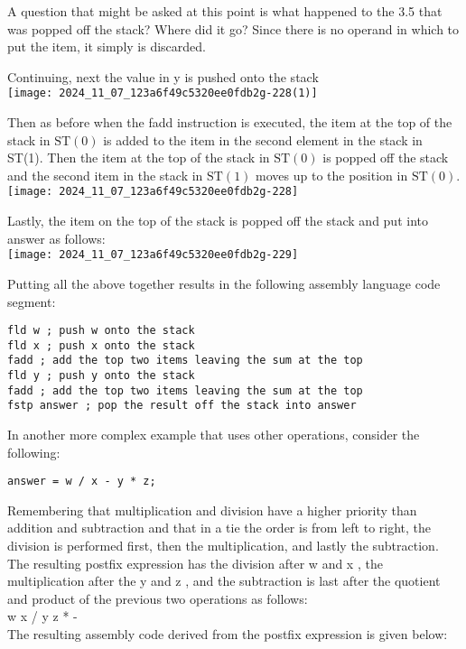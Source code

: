 \documentclass[10pt]{article}
\begin{document}
A question that might be asked at this point is what happened to the 3.5 that was popped off the stack? Where did it go? Since there is no operand in which to put the item, it simply is discarded.

Continuing, next the value in y is pushed onto the stack\\
\texttt{[image: 2024\_11\_07\_123a6f49c5320ee0fdb2g-228(1)]}

Then as before when the fadd instruction is executed, the item at the top of the stack in $\mathrm{ST}(0)$ is added to the item in the second element in the stack in ST(1). Then the item at the top of the stack in $\mathrm{ST}(0)$ is popped off the stack and the second item in the stack in $\mathrm{ST}(1)$ moves up to the position in $\mathrm{ST}(0)$.\\
\texttt{[image: 2024\_11\_07\_123a6f49c5320ee0fdb2g-228]}

Lastly, the item on the top of the stack is popped off the stack and put into answer as follows:\\
\texttt{[image: 2024\_11\_07\_123a6f49c5320ee0fdb2g-229]}

Putting all the above together results in the following assembly language code segment:

\begin{verbatim}
fld w ; push w onto the stack
fld x ; push x onto the stack
fadd ; add the top two items leaving the sum at the top
fld y ; push y onto the stack
fadd ; add the top two items leaving the sum at the top
fstp answer ; pop the result off the stack into answer
\end{verbatim}

In another more complex example that uses other operations, consider the following:

\begin{verbatim}
answer = w / x - y * z;
\end{verbatim}

Remembering that multiplication and division have a higher priority than addition and subtraction and that in a tie the order is from left to right, the division is performed first, then the multiplication, and lastly the subtraction. The resulting postfix expression has the division after w and x , the multiplication after the y and z , and the subtraction is last after the quotient and product of the previous two operations as follows:\\
w x / y z * -\\
The resulting assembly code derived from the postfix expression is given below:
\end{document}
